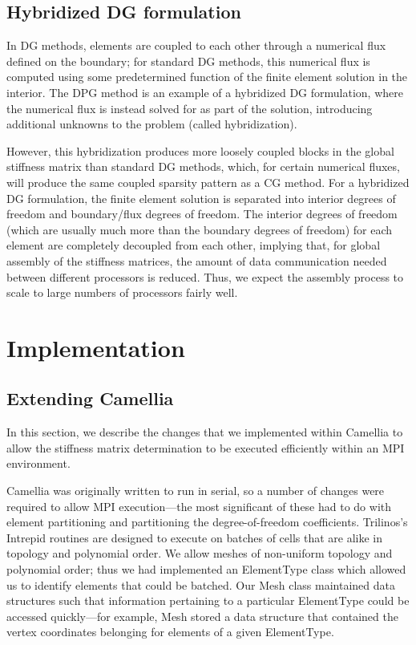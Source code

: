 \documentclass{article}
\begin{document}
\subsection{Hybridized DG formulation}

In DG methods, elements are coupled to each other through a numerical flux defined on the boundary; for standard DG methods, this numerical flux is computed using some predetermined function of the finite element solution in the interior. The DPG method is an example of a hybridized DG formulation, where the numerical flux is instead solved for as part of the solution, introducing additional unknowns to the problem (called hybridization). 

However, this hybridization produces more loosely coupled blocks in the global stiffness matrix than standard DG methods, which, for certain numerical fluxes, will produce the same coupled sparsity pattern as a CG method. For a hybridized DG formulation, the finite element solution is separated into interior degrees of freedom and boundary/flux degrees of freedom. The interior degrees of freedom (which are usually much more than the boundary degrees of freedom) for each element are completely decoupled from each other, implying that, for global assembly of the stiffness matrices, the amount of data communication needed between different processors is reduced. Thus, we expect the assembly process to scale to large numbers of processors fairly well. 

\section{Implementation}\label{sec:Implementation}

\subsection{Extending Camellia}

In this section, we describe the changes that we implemented within Camellia to allow the stiffness matrix determination to be executed efficiently within an MPI environment.

Camellia was originally written to run in serial, so a number of changes were required to allow MPI execution---the most significant of these had to do with element partitioning and partitioning the degree-of-freedom coefficients.  Trilinos's Intrepid routines are designed to execute on batches of cells that are alike in topology and polynomial order.  We allow meshes of non-uniform topology and polynomial order; thus we had implemented an ElementType class which allowed us to identify elements that could be batched.  Our Mesh class maintained data structures such that information pertaining to a particular ElementType could be accessed quickly---for example, Mesh stored a data structure that contained the vertex coordinates belonging for elements of a given ElementType.
\end{document}
